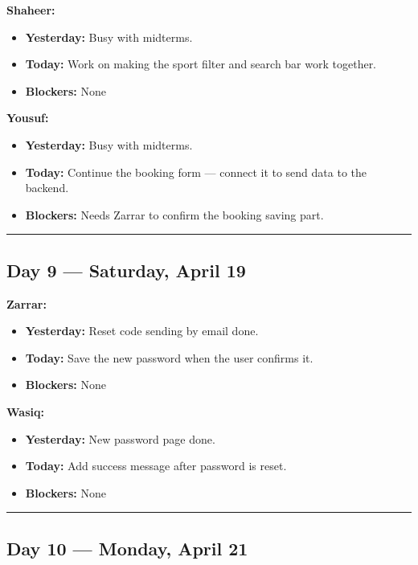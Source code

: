 \documentclass[12pt,a4paper]{article}
\begin{document}
\textbf{Shaheer:}
\begin{itemize}[noitemsep]
    \item \textbf{Yesterday:} Busy with midterms.
    \item \textbf{Today:} Work on making the sport filter and search bar work together.
    \item \textbf{Blockers:} None
\end{itemize}

\textbf{Yousuf:}
\begin{itemize}[noitemsep]
    \item \textbf{Yesterday:} Busy with midterms.
    \item \textbf{Today:} Continue the booking form --- connect it to send data to the backend.
    \item \textbf{Blockers:} Needs Zarrar to confirm the booking saving part.
\end{itemize}

\vspace{1em}\hrule\vspace{1em}

\newpage

\subsection*{Day 9 --- Saturday, April 19}

\textbf{Zarrar:}
\begin{itemize}[noitemsep]
    \item \textbf{Yesterday:} Reset code sending by email done.
    \item \textbf{Today:} Save the new password when the user confirms it.
    \item \textbf{Blockers:} None
\end{itemize}

\textbf{Wasiq:}
\begin{itemize}[noitemsep]
    \item \textbf{Yesterday:} New password page done.
    \item \textbf{Today:} Add success message after password is reset.
    \item \textbf{Blockers:} None
\end{itemize}

\vspace{1em}\hrule\vspace{1em}

\subsection*{Day 10 --- Monday, April 21}
\end{document}
